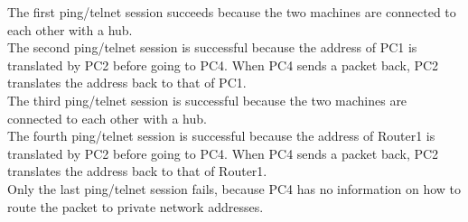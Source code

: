 The first ping/telnet session succeeds because the two machines are connected to each other with a hub. \\
The second ping/telnet session is successful because the address of PC1 is translated by PC2 before going to PC4. When PC4 sends a packet back, PC2 translates the address back to that of PC1. \\
The third ping/telnet session is successful because the two machines are connected to each other with a hub. \\
The fourth ping/telnet session is successful because the address of Router1 is translated by PC2 before going to PC4. When PC4 sends a packet back, PC2 translates the address back to that of Router1. \\
Only the last ping/telnet session fails, because PC4 has no information on how to route the packet to private network addresses.
